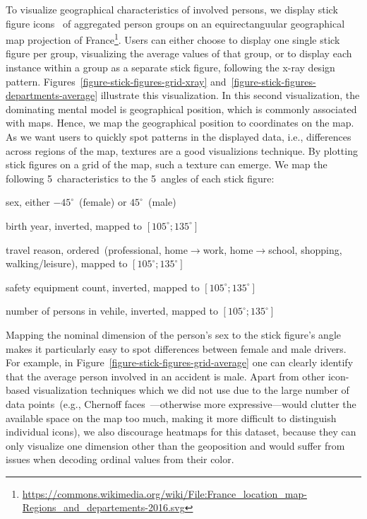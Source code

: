 To visualize geographical characteristics of involved persons, we display stick figure icons~\cite{PickettG1988} of aggregated person groups on an equirectanguular geographical map projection of France\footnote{\url{https://commons.wikimedia.org/wiki/File:France_location_map-Regions_and_departements-2016.svg}}.
Users can either choose to display one single stick figure per group, visualizing the average values of that group, or to display each instance within a group as a separate stick figure, following the x-ray design pattern.
Figures~\ref{figure-stick-figures-grid-xray} and~\ref{figure-stick-figures-departments-average} illustrate this visualization.
In this second visualization, the dominating mental model is geographical position, which is commonly associated with maps. Hence, we map the geographical position to coordinates on the map. As we want users to quickly spot patterns in the displayed data, i.e., differences across regions of the map, textures are a good visualizions technique.
By plotting stick figures on a grid of the map, such a texture can emerge. We map the following 5~characteristics to the 5~angles of each stick figure:
\begin{description}
    \setlength{\itemsep}{1pt}
    \item[\(\alpha\)] sex, either \(-45^\circ\)~(female) or \(45^\circ\)~(male)
    \item[\(\beta\)] birth year, inverted, mapped to  \([105^\circ; 135^\circ]\)
    \item[\(\gamma\)] travel reason, ordered~(professional, home\(\to\)work, home\(\to\)school, shopping, walking/leisure), mapped to  \([105^\circ; 135^\circ]\)
    \item[\(\delta\)] safety equipment count, inverted, mapped to  \([105^\circ; 135^\circ]\)
    \item[\(\epsilon\)] number of persons in vehile, inverted, mapped to  \([105^\circ; 135^\circ]\)
\end{description}
Mapping the nominal dimension of the person's sex to the stick figure's angle makes it particularly easy to spot differences between female and male drivers. For example, in Figure~\ref{figure-stick-figures-grid-average} one can clearly identify that the average person involved in an accident is male.
Apart from other icon-based visualization techniques which we did not use due to the large number of data points~(e.g., Chernoff faces~\cite{Chernoff1973}---otherwise more expressive---would clutter the available space on the map too much, making it more difficult to distinguish individual icons), we also discourage heatmaps for this dataset, because they can only visualize one dimension other than the geoposition and would suffer from issues when decoding ordinal values from their color.
